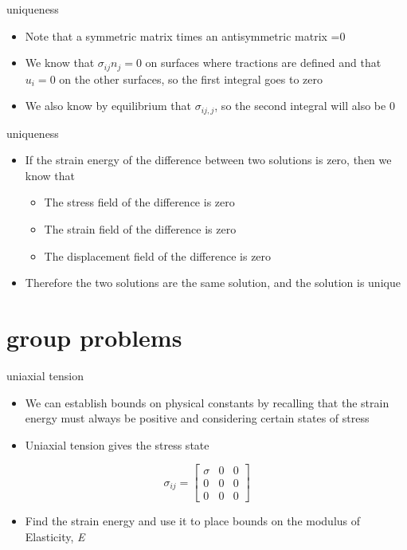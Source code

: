 \documentclass[
  letterpaper,
  ignorenonframetext,
  aspectratio=43,
  handout,
  12pt]{beamer}
\providecommand{\tightlist}{%
  \setlength{\itemsep}{0pt}\setlength{\parskip}{0pt}}
\providecommand{\tightlist}{%
\setlength{\itemsep}{0pt}\setlength{\parskip}{0pt}}
\begin{document}
\begin{frame}{uniqueness}
\protect\hypertarget{uniqueness-3}{}
\begin{itemize}
\tightlist
\item
  Note that a symmetric matrix times an antisymmetric matrix =0
\item
  We know that \(\sigma_{ij}n_j = 0\) on surfaces where tractions are
  defined and that \(u_i = 0\) on the other surfaces, so the first
  integral goes to zero
\item
  We also know by equilibrium that \(\sigma_{ij,j}\), so the second
  integral will also be 0
\end{itemize}
\end{frame}

\begin{frame}{uniqueness}
\protect\hypertarget{uniqueness-4}{}
\begin{itemize}
\tightlist
\item
  If the strain energy of the difference between two solutions is zero,
  then we know that

  \begin{itemize}
  \tightlist
  \item
    The stress field of the difference is zero
  \item
    The strain field of the difference is zero
  \item
    The displacement field of the difference is zero
  \end{itemize}
\item
  Therefore the two solutions are the same solution, and the solution is
  unique
\end{itemize}
\end{frame}

\hypertarget{group-problems}{%
\section{group problems}\label{group-problems}}

\begin{frame}{uniaxial tension}
\protect\hypertarget{uniaxial-tension}{}
\begin{itemize}
\tightlist
\item
  We can establish bounds on physical constants by recalling that the
  strain energy must always be positive and considering certain states
  of stress
\item
  Uniaxial tension gives the stress state
\end{itemize}

\[\sigma_{ij} = \begin{bmatrix}
    \sigma & 0 & 0 \\
    0 & 0 & 0\\
    0 & 0 & 0
\end{bmatrix}\]

\begin{itemize}
\tightlist
\item
  Find the strain energy and use it to place bounds on the modulus of
  Elasticity, \emph{E}
\end{itemize}
\end{frame}
\end{document}

